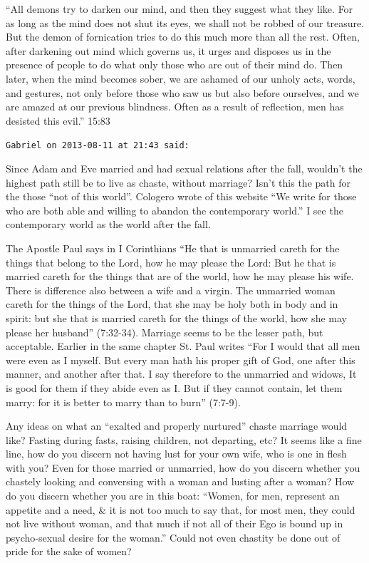 \begin{footnotesize}
\begin{sffamily}
``All demons try to darken our mind, and then they suggest what they like. For as long as the mind does not shut its eyes, we shall not be robbed of our treasure. But the demon of fornication tries to do this much more than all the rest. Often, after darkening out mind which governs us, it urges and disposes us in the presence of people to do what only those who are out of their mind do. Then later, when the mind becomes sober, we are ashamed of our unholy acts, words, and gestures, not only before those who saw us but also before ourselves, and we are amazed at our previous blindness. Often as a result of reflection, men has desisted this evil.'' 15:83

\hfill

\texttt{Gabriel on 2013-08-11 at 21:43 said:}

Since Adam and Eve married and had sexual relations after the fall, wouldn't the highest path still be to live as chaste, without marriage? Isn't this the path for the those ``not of this world''. Cologero wrote of this website ``We write for those who are both able and willing to abandon the contemporary world.'' I see the contemporary world as the world after the fall.

The Apostle Paul says in I Corinthians ``He that is unmarried careth for the things that belong to the Lord, how he may please the Lord: But he that is married careth for the things that are of the world, how he may please his wife. There is difference also between a wife and a virgin. The unmarried woman careth for the things of the Lord, that she may be holy both in body and in spirit: but she that is married careth for the things of the world, how she may please her husband'' (7:32-34). Marriage seems to be the lesser path, but acceptable. Earlier in the same chapter St. Paul writes ``For I would that all men were even as I myself. But every man hath his proper gift of God, one after this manner, and another after that. I say therefore to the unmarried and widows, It is good for them if they abide even as I. But if they cannot contain, let them marry: for it is better to marry than to burn'' (7:7-9).

Any ideas on what an ``exalted and properly nurtured'' chaste marriage would like? Fasting during fasts, raising children, not departing, etc? It seems like a fine line, how do you discern not having lust for your own wife, who is one in flesh with you? Even for those married or unmarried, how do you discern whether you chastely looking and conversing with a woman and lusting after a woman? How do you discern whether you are in this boat: ``Women, for men, represent an appetite and a need, \& it is not too much to say that, for most men, they could not live without woman, and that much if not all of their Ego is bound up in psycho-sexual desire for the woman.'' Could not even chastity be done out of pride for the sake of women?


\end{sffamily}
\end{footnotesize}
